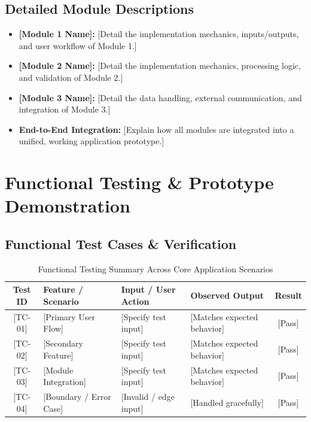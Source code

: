 \documentclass[11pt, a4paper]{article}
\begin{document}
\subsection{Detailed Module Descriptions}
\begin{itemize}[noitemsep, topsep=2pt]
    \item \textbf{[Module 1 Name]:} {[Detail the implementation mechanics, inputs/outputs, and user workflow of Module 1.]}
    \item \textbf{[Module 2 Name]:} {[Detail the implementation mechanics, processing logic, and validation of Module 2.]}
    \item \textbf{[Module 3 Name]:} {[Detail the data handling, external communication, and integration of Module 3.]}
    \item \textbf{End-to-End Integration:} {[Explain how all modules are integrated into a unified, working application prototype.]}
\end{itemize}

\section{Functional Testing \& Prototype Demonstration}

\subsection{Functional Test Cases \& Verification}
\begin{table}[H]
    \centering
    \footnotesize
    \renewcommand{\arraystretch}{1.25}
    \begin{tabular}{|c|p{3.2cm}|p{3.4cm}|p{4.0cm}|c|}
        \hline
        \textbf{Test ID} & \textbf{Feature / Scenario} & \textbf{Input / User Action} & \textbf{Observed Output} & \textbf{Result} \\
        \hline
        {[TC-01]} & {[Primary User Flow]} & {[Specify test input]} & {[Matches expected behavior]} & {[Pass]} \\
        \hline
        {[TC-02]} & {[Secondary Feature]} & {[Specify test input]} & {[Matches expected behavior]} & {[Pass]} \\
        \hline
        {[TC-03]} & {[Module Integration]} & {[Specify test input]} & {[Matches expected behavior]} & {[Pass]} \\
        \hline
        {[TC-04]} & {[Boundary / Error Case]} & {[Invalid / edge input]} & {[Handled gracefully]} & {[Pass]} \\
        \hline
    \end{tabular}
    \caption{Functional Testing Summary Across Core Application Scenarios}
\end{table}
\end{document}
